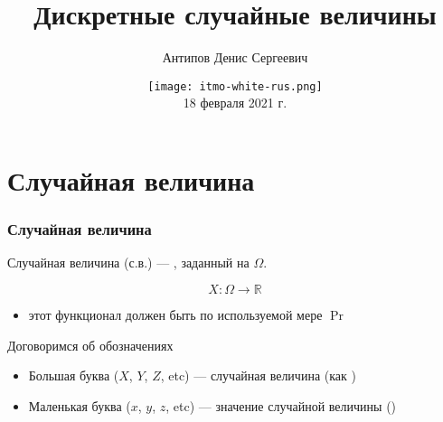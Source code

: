 \documentclass[hyperref=unicode,graphics=pdflatex,13pt,xcolor={usenames,dvipsnames}]{beamer}
\title[Дискретные случайные величины]{Дискретные случайные величины}
\author[Антипов Д. С.]
{Антипов Денис Сергеевич}
\institute{
Университет ИТМО, Санкт-Петербург, Россия\\
~\\
}
\date[]{\texttt{[image: itmo-white-rus.png]} \\
18 февраля 2021 г.}
\renewcommand\emph[1]{{\color{blue}{#1}}}
\newcommand\pitem{\pause\item}
\newcommand\R{\mathbb{R}}
\begin{document}
\begin{frame}
  \titlepage
\end{frame}

\section{Случайная величина}
\begin{frame}
  \frametitle{Случайная величина}

  Случайная величина (с.в.) --- \emph{функционал}, заданный на $\Omega$.

  \[
    X: \Omega \to \R
  \]
  \pause
  \begin{itemize}
    \pitem \emph{NB:} этот функционал должен быть \emph{измерим} по используемой мере $\Pr$ 
  \end{itemize}

  \pause
  \vspace{1em}
  Договоримся об обозначениях

  \begin{itemize}
    \item Большая буква ($X$, $Y$, $Z$, etc) --- случайная величина (как \emph{отображение})
    \item Маленькая буква ($x$, $y$, $z$, etc) --- значение случайной величины (\emph{число})
  \end{itemize}
\end{frame}
\end{document}
